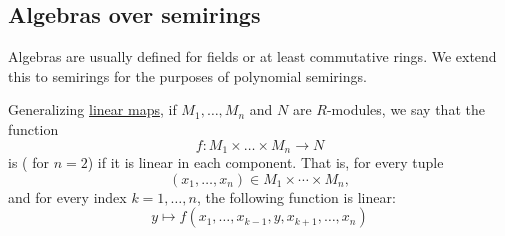\subsection{Algebras over semirings}\label{subsec:algebras_over_semirings}

Algebras are usually defined for fields or at least commutative rings. We extend this to semirings for the purposes of polynomial semirings.

\begin{definition}\label{def:multilinear_function}\mimprovised
  Generalizing \hyperref[def:semimodule/homomorphism]{linear maps}, if \( M_1, \ldots, M_n \) and \( N \) are \( R \)-modules, we say that the function
  \begin{equation*}
    f: M_1 \times \ldots \times M_n \to N
  \end{equation*}
  is  ( for \( n = 2 \)) if it is linear in each component. That is, for every tuple
  \begin{equation*}
    (x_1, \ldots, x_n) \in M_1 \times \cdots \times M_n,
  \end{equation*}
  and for every index \( k = 1, \ldots, n \), the following function is linear:
  \begin{equation*}
    y \mapsto f(x_1, \ldots, x_{k-1}, y, x_{k+1}, \ldots, x_n)
  \end{equation*}
\end{definition}

